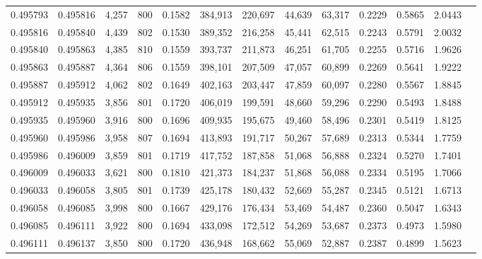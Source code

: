 \begin{tabular}{rrrrrrrrrrrrr}
0.495793 & 0.495816 &  4,257 & 800 &                                     0.1582 & 384,913 & 220,697 &  44,639 &  63,317 & 0.2229 & 0.5865 & 2.0443 \\
0.495816 & 0.495840 &  4,439 & 802 &                                     0.1530 & 389,352 & 216,258 &  45,441 &  62,515 & 0.2243 & 0.5791 & 2.0032 \\
0.495840 & 0.495863 &  4,385 & 810 &                                     0.1559 & 393,737 & 211,873 &  46,251 &  61,705 & 0.2255 & 0.5716 & 1.9626 \\
0.495863 & 0.495887 &  4,364 & 806 &                                     0.1559 & 398,101 & 207,509 &  47,057 &  60,899 & 0.2269 & 0.5641 & 1.9222 \\
0.495887 & 0.495912 &  4,062 & 802 &                                     0.1649 & 402,163 & 203,447 &  47,859 &  60,097 & 0.2280 & 0.5567 & 1.8845 \\
0.495912 & 0.495935 &  3,856 & 801 &                                     0.1720 & 406,019 & 199,591 &  48,660 &  59,296 & 0.2290 & 0.5493 & 1.8488 \\
0.495935 & 0.495960 &  3,916 & 800 &                                     0.1696 & 409,935 & 195,675 &  49,460 &  58,496 & 0.2301 & 0.5419 & 1.8125 \\
0.495960 & 0.495986 &  3,958 & 807 &                                     0.1694 & 413,893 & 191,717 &  50,267 &  57,689 & 0.2313 & 0.5344 & 1.7759 \\
0.495986 & 0.496009 &  3,859 & 801 &                                     0.1719 & 417,752 & 187,858 &  51,068 &  56,888 & 0.2324 & 0.5270 & 1.7401 \\
0.496009 & 0.496033 &  3,621 & 800 &                                     0.1810 & 421,373 & 184,237 &  51,868 &  56,088 & 0.2334 & 0.5195 & 1.7066 \\
0.496033 & 0.496058 &  3,805 & 801 &                                     0.1739 & 425,178 & 180,432 &  52,669 &  55,287 & 0.2345 & 0.5121 & 1.6713 \\
0.496058 & 0.496085 &  3,998 & 800 &                                     0.1667 & 429,176 & 176,434 &  53,469 &  54,487 & 0.2360 & 0.5047 & 1.6343 \\
0.496085 & 0.496111 &  3,922 & 800 &                                     0.1694 & 433,098 & 172,512 &  54,269 &  53,687 & 0.2373 & 0.4973 & 1.5980 \\
0.496111 & 0.496137 &  3,850 & 800 &                                     0.1720 & 436,948 & 168,662 &  55,069 &  52,887 & 0.2387 & 0.4899 & 1.5623 \\

\end{tabular}
